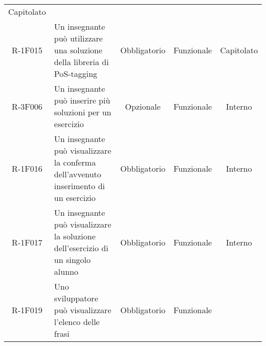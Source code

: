 \begin{tabularx}{\textwidth}{cXccc}
Capitolato \\
R-1F015 &

Un insegnante può utilizzare una soluzione della libreria di PoS-tagging &

Obbligatorio &

Funzionale &

Capitolato \\
R-3F006 &


Un insegnante può inserire più soluzioni per un esercizio &

Opzionale &

Funzionale &

Interno \\
R-1F016 &

Un insegnante può visualizzare la conferma dell'avvenuto inserimento di un esercizio &

Obbligatorio &

Funzionale &

Interno \\
R-1F017 &

Un insegnante può visualizzare la soluzione dell’esercizio di un singolo alunno &

Obbligatorio &

Funzionale &

Interno \\
R-1F019 &

Uno sviluppatore può visualizzare l’elenco delle frasi &

Obbligatorio &

Funzionale &


\end{tabularx}
